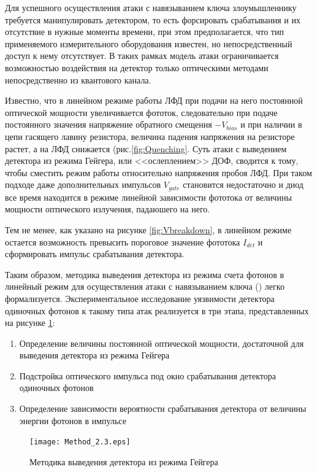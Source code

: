 Для успешного осуществления атаки с навязыванием ключа злоумышленнику требуется манипулировать детектором, то есть форсировать срабатывания и их отсутствие в нужные моменты времени, при этом предполагается, что тип применяемого измерительного оборудования известен, но непосредственный доступ к нему отсутствует. В таких рамках модель атаки ограничивается возможностью воздействия на детектор только оптическими методами непосредственно из квантового канала. 


Известно, что в линейном режиме работы ЛФД при подачи на него постоянной оптической мощности увеличивается фототок, следовательно при подаче постоянного значения напряжение обратного смещения $-V_{bias}$ и при наличии в цепи гасящего лавину резистора, величина падения напряжения на резисторе растет, а на ЛФД снижается (рис.\ref{fig:Quenching}. Суть атаки с выведением детектора из режима Гейгера, или <<ослеплением>> ДОФ, сводится к тому, чтобы сместить режим работы относительно напряжения пробоя ЛФД. При таком подходе даже дополнительных импульсов $V_{gate}$ становится недостаточно и диод все время находится в режиме линейной зависимости фототока от величины мощности оптического излучения, падаюшего на него.  

Тем не менее, как указано на рисунке \ref{fig:Vbreakdown}, в линейном режиме остается возможность превысить пороговое значение фототока $I_{det}$ и сформировать импульс срабатывания детектора.

Таким образом, методика выведения детектора из режима счета фотонов в линейный режим для осуществления атаки с навязыванием ключа () легко формализуется. Экспериментальное исследование уязвимости детектора одиночных фотонов к такому типа атак реализуется в три этапа, представленных на рисунке \ref{fig:Method_2.3}:

 \begin{enumerate}
	\item Определение величины постоянной оптической мощности, достаточной для выведения детектора из режима Гейгера
	\item Подстройка оптического импульса под окно срабатывания детектора одиночных фотонов
	\item Определение зависимости вероятности срабатывания детектора от величины энергии фотонов в импульсе
\end{enumerate}

 \begin{figure}[ht] 
  \centering
  \texttt{[image: Method\_2.3.eps]}
  \caption{Методика выведения детектора из режима Гейгера}
  \label{fig:Method_2.3}
\end{figure}

